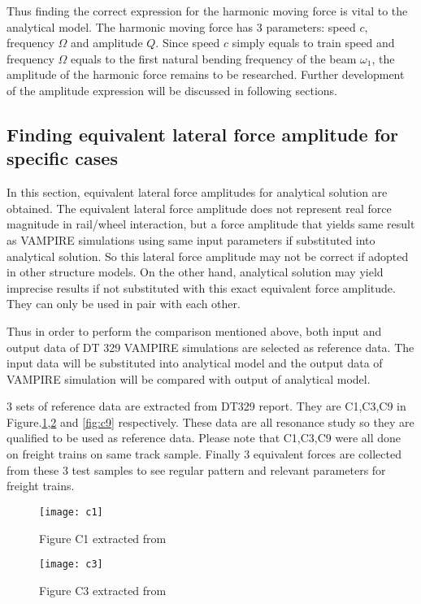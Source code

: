 Thus finding the correct expression for the harmonic moving force is vital to the analytical model. The harmonic moving force has 3 parameters: speed $c$, frequency $\Omega$  and amplitude $Q$. Since speed $c$ simply equals to train speed and frequency $\Omega$ equals to the first natural bending frequency of the beam $\omega_1$, the amplitude of the harmonic force remains to be researched. Further development of the amplitude expression will be discussed in following sections.



\subsection{Finding equivalent lateral force amplitude for specific cases}\label{sec:findingequivalentamplitude}
In this section, equivalent lateral force amplitudes for analytical solution are obtained. The equivalent lateral force amplitude does not represent real force magnitude in rail/wheel interaction, but a force amplitude that yields same result as VAMPIRE simulations using same input parameters if substituted into analytical solution. So this lateral force amplitude may not be correct if adopted in other structure models. On the other hand, analytical solution may yield imprecise results if not substituted with this exact equivalent force amplitude. They can only be used in pair with each other.

Thus in order to perform the comparison mentioned above, both input and output data of DT 329 VAMPIRE simulations are selected as reference data. The input data will be substituted into analytical model and the output data of VAMPIRE simulation will be compared with output of analytical model. 

3 sets of reference data are extracted from DT329 report. They are C1,C3,C9 in Figure.\ref{fig:c1},\ref{fig:c3} and \ref{fig:c9} respectively. These data are all resonance study so they are qualified to be used as reference data. Please note that C1,C3,C9 were all done on freight trains on same track sample. Finally 3 equivalent forces are collected from these 3 test samples to see regular pattern and relevant parameters for freight trains.

\begin{figure}[h!]
    \centering
    \texttt{[image: c1]}
    \caption{Figure C1 extracted from \cite{d181dt329} }
    \label{fig:c1}
\end{figure}

\begin{figure}[h!]
    \centering
    \texttt{[image: c3]}
    \caption{Figure C3 extracted from \cite{d181dt329} }
    \label{fig:c3}
\end{figure}

